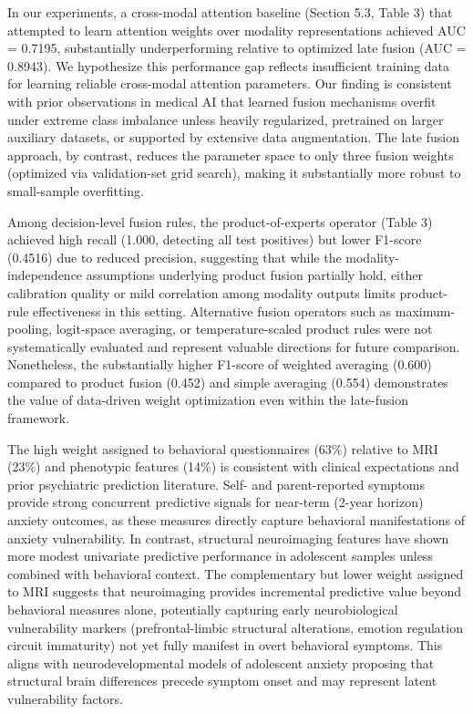 \documentclass[10pt,letterpaper]{article}
\begin{document}
In our experiments, a cross-modal attention baseline (Section 5.3, Table 3) that attempted to learn attention weights over modality representations achieved AUC = 0.7195, substantially underperforming relative to optimized late fusion (AUC = 0.8943). We hypothesize this performance gap reflects insufficient training data for learning reliable cross-modal attention parameters. Our finding is consistent with prior observations in medical AI that learned fusion mechanisms overfit under extreme class imbalance unless heavily regularized, pretrained on larger auxiliary datasets, or supported by extensive data augmentation. The late fusion approach, by contrast, reduces the parameter space to only three fusion weights (optimized via validation-set grid search), making it substantially more robust to small-sample overfitting.

Among decision-level fusion rules, the product-of-experts operator (Table 3) achieved high recall (1.000, detecting all test positives) but lower F1-score (0.4516) due to reduced precision, suggesting that while the modality-independence assumptions underlying product fusion partially hold, either calibration quality or mild correlation among modality outputs limits product-rule effectiveness in this setting. Alternative fusion operators such as maximum-pooling, logit-space averaging, or temperature-scaled product rules were not systematically evaluated and represent valuable directions for future comparison. Nonetheless, the substantially higher F1-score of weighted averaging (0.600) compared to product fusion (0.452) and simple averaging (0.554) demonstrates the value of data-driven weight optimization even within the late-fusion framework.

The high weight assigned to behavioral questionnaires (63\%) relative to MRI (23\%) and phenotypic features (14\%) is consistent with clinical expectations and prior psychiatric prediction literature. Self- and parent-reported symptoms provide strong concurrent predictive signals for near-term (2-year horizon) anxiety outcomes, as these measures directly capture behavioral manifestations of anxiety vulnerability. In contrast, structural neuroimaging features have shown more modest univariate predictive performance in adolescent samples unless combined with behavioral context. The complementary but lower weight assigned to MRI suggests that neuroimaging provides incremental predictive value beyond behavioral measures alone, potentially capturing early neurobiological vulnerability markers (prefrontal-limbic structural alterations, emotion regulation circuit immaturity) not yet fully manifest in overt behavioral symptoms. This aligns with neurodevelopmental models of adolescent anxiety proposing that structural brain differences precede symptom onset and may represent latent vulnerability factors.
\end{document}
